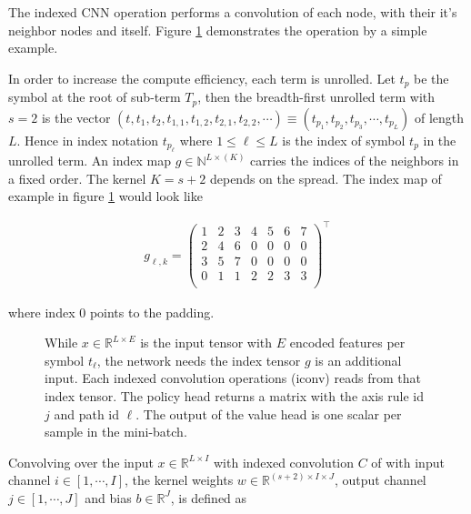 \documentclass{scrartcl}
\theoremstyle{definition}
\begin{document}
The indexed CNN operation performs a convolution of each node, with their it's neighbor nodes and itself.
Figure \ref{fig:index_tensor} demonstrates the operation by a simple example.

\begin{figure}[!htbp]
	\centering
	
	\label{fig:index_tensor}
\end{figure}

In order to increase the compute efficiency, each term is unrolled.
Let $t_p$ be the symbol at the root of sub-term $T_p$,
then the breadth-first unrolled term with $s=2$ is the vector $\left( t, t_1, t_2, t_{1,1},t_{1,2}, t_{2,1}, t_{2,2}, \cdots \right) \equiv  \left( t_{p_1}, t_{p_2}, t_{p_3},\cdots, t_{p_L} \right)$ of length $L$.
Hence in index notation $t_{p_\ell}$ where $1 \leq \ell \leq L$ is the index of symbol $t_p$ in the unrolled term.
An index map $g \in \mathbb{N}^{L\times \left(K\right)}$ carries the indices of the neighbors in a fixed order.
The kernel $K= s+2$ depends on the spread.
The index map of example in figure \ref{fig:index_tensor} would look like

\begin{align}
	g_{\ell,k} = 
	\begin{pmatrix}
		1 & 2 & 3 & 4 & 5 & 6 & 7 \\
		2 & 4 & 6 & 0 & 0 & 0 & 0 \\
		3 & 5 & 7 & 0 & 0 & 0 & 0 \\
		0 & 1 & 1 & 2 & 2 & 3 & 3 \\
	\end{pmatrix}^\top
\end{align}

where index $0$ points to the padding.


\begin{figure}[!htbp]
	\centering
	
	\caption{While $x\in \mathbb{R}^{L\times E}$ is the input tensor with $E$ encoded features per symbol $t_\ell$, the network needs the index tensor $g$ is an additional input.
		Each indexed convolution operations (iconv) reads from that index tensor.
		The policy head returns a matrix with the axis rule id $j$ and path id $\ell$. 
		The output of the value head is one scalar per sample in the mini-batch. 
	}
	\label{fig:iconv_network}
\end{figure}

Convolving over the input $x \in \mathbb{R}^{L\times I}$ with indexed convolution $C$ of with input channel $i \in \left[1,\cdots,I\right]$,
the kernel weights $w \in \mathbb{R}^{\left( s+2 \right)\times I \times J}$, output channel $j \in \left[1,\cdots,J\right]$ and bias $b \in \mathbb{R}^J$,
is defined as
\end{document}
